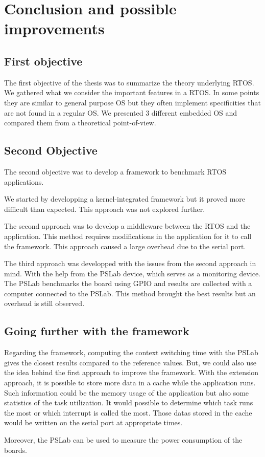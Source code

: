 \chapter*{Conclusion and possible improvements}

\section*{First objective}
The first objective of the thesis was to summarize the theory underlying RTOS.
We gathered what we consider the important features in a RTOS.
In some points they are similar to general purpose OS but they often implement specificities that are not found in a regular OS.
We presented 3 different embedded OS and compared them from a theoretical point-of-view.

\section*{Second Objective}
The second objective was to develop a framework to benchmark RTOS applications.

We started by developping a kernel-integrated framework but it proved more difficult than expected.
This approach was not explored further.

The second approach was to develop a middleware between the RTOS and the application.
This method requires modifications in the application for it to call the framework.
This approach caused a large overhead due to the serial port.

The third approach was developped with the issues from the second approach in mind.
With the help from the PSLab device, which serves as a monitoring device.
The PSLab benchmarks the board using GPIO and results are collected with a computer connected to the PSLab.
This method brought the best results but an overhead is still observed.

\section*{Going further with the framework}

Regarding the framework, computing the context switching time with the PSLab gives the closest results compared to the reference values.
But, we could also use the idea behind the first approach to improve the framework.
With the extension approach, it is possible to store more data in a cache while the application runs.
Such information could be the memory usage of the application but also some statistics of the task utilization.
It would possible to determine which task runs the most or which interrupt is called the most.
Those datas stored in the cache would be written on the serial port at appropriate times.

Moreover, the PSLab can be used to measure the power consumption of the boards.